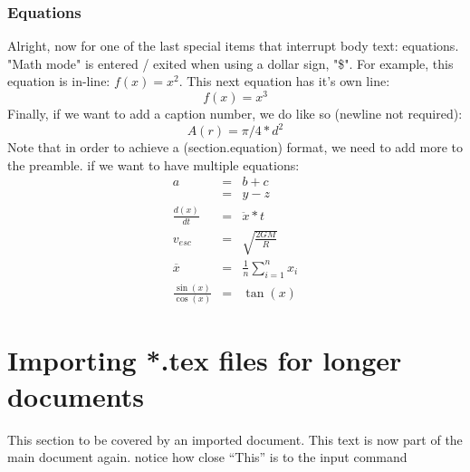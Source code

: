 \documentclass[a4paper,12pt]{article} %
\begin{document}
\subsubsection{Equations}
Alright, now for one of the last special items that interrupt body text: equations. "Math mode" is entered / exited when using a dollar sign, "\$". For example, this equation is in-line: $ f(x)=x^2 $. This next equation has it's own line: $$f(x) = x^3$$ Finally, if we want to add a caption number, we do like so (newline not required):
\begin{equation}
A(r) = \pi/4*d^2
\end{equation}
Note that in order to achieve a (section.equation) format, we need to add more to the preamble. if we want to have multiple equations:
\begin{eqnarray}
a & = & b + c \\ %
& = & y - z\\
\frac{d(x)}{dt} &=& \ddot x * t \\
v_{esc} &=& \sqrt{\frac{2GM}{R}} \\
\overline x &=& \frac{1}{n}\sum_{i=1}^{n} x_i \\ %
\frac{\sin(x)}{\cos(x)} &=& \tan(x) 
\end{eqnarray} %

\section{Importing *.tex files for longer documents} \label{sect_teximporting}
This section to be covered by an imported document.
This text is now part of the main document again. notice how close ``This'' is to the input command

\end{document}
